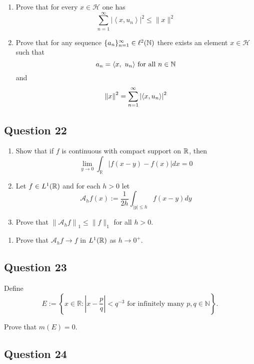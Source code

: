 \documentclass[12pt]{article}
\providecommand{\tightlist}{%
  \setlength{\itemsep}{0pt}\setlength{\parskip}{0pt}}
\begin{document}
\begin{enumerate}
\def\labelenumi{\alph{enumi}.}
\item
  Prove that for every \(x \in \mathcal H\) one has \[
  \displaystyle\sum_{n=1}^{\infty}\left|\left\langle x, u_{n}\right\rangle\right|^{2} \leq\|x\|^{2}
  \]
\item
  Prove that for any sequence \(\{a_n\}_{n=1}^\infty \in \ell^2({\mathbb{N}})\)
  there exists an element \(x\in\mathcal H\) such that \[
  a_n = {\left\langle {x},~{u_n} \right\rangle} \text{ for all } n\in {\mathbb{N}}
  \] and \[
  {\left\lVert {x} \right\rVert}^2 = \sum_{n=1}^{\infty}\left|\left\langle x, u_{n}\right\rangle\right|^{2}
  \]
\end{enumerate}

\hypertarget{question-22-1}{%
\subsection{Question 22}\label{question-22-1}}

\begin{enumerate}
\def\labelenumi{\alph{enumi}.}
\item
  Show that if \(f\) is continuous with compact support on \({\mathbb{R}}\), then
  \[
  \lim _{y \rightarrow 0} \int_{\mathbb{R}}|f(x-y)-f(x)| d x=0
  \]
\item
  Let \(f\in L^1({\mathbb{R}})\) and for each \(h > 0\) let \[
  \mathcal{A}_{h} f(x):=\frac{1}{2 h} \int_{|y| \leq h} f(x-y) d y
  \]
\item
  Prove that \(\left\|\mathcal{A}_{h} f\right\|_{1} \leq\|f\|_{1}\) for
  all \(h > 0\).
\end{enumerate}

\begin{enumerate}
\def\labelenumi{\roman{enumi}.}
\setcounter{enumi}{1}
\tightlist
\item
  Prove that \(\mathcal{A}_h f \to f\) in \(L^1({\mathbb{R}})\) as \(h \to 0^+\).
\end{enumerate}

\hypertarget{question-23-1}{%
\subsection{Question 23}\label{question-23-1}}

Define \[
E:=\left\{x \in \mathbb{R}:\left|x-\frac{p}{q}\right|<q^{-3} \text { for infinitely many } p, q \in \mathbb{N}\right\}.
\]

Prove that \(m(E) = 0\).

\hypertarget{question-24-1}{%
\subsection{Question 24}\label{question-24-1}}
\end{document}
